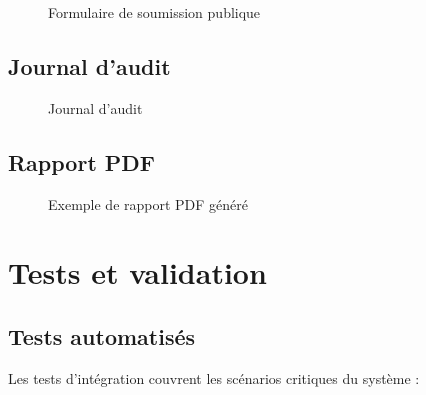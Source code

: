 \begin{figure}[ht]
\centering
{}
\caption{Formulaire de soumission publique}
\label{fig:portail_submit}
\end{figure}

\subsection{Journal d'audit}

\begin{figure}[ht]
\centering
{}
\caption{Journal d'audit}
\label{fig:audit}
\end{figure}

\subsection{Rapport PDF}

\begin{figure}[ht]
\centering
{}
\caption{Exemple de rapport PDF généré}
\label{fig:rapport_pdf}
\end{figure}

\section{Tests et validation}

\subsection{Tests automatisés}

Les tests d'intégration couvrent les scénarios critiques du système :

